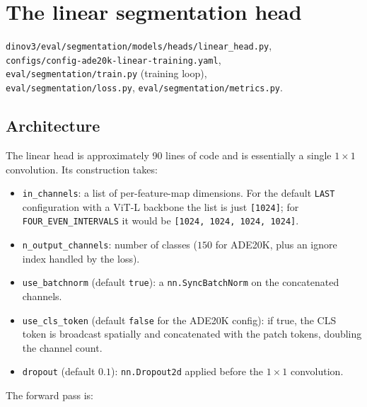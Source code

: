 \documentclass[11pt,a4paper]{article}
\begin{document}
\section{The linear segmentation head}
\label{sec:linear}

\begin{srcbox}
\texttt{dinov3/eval/segmentation/models/heads/linear\_head.py},\\
\texttt{configs/config-ade20k-linear-training.yaml},\\
\texttt{eval/segmentation/train.py} (training loop),\\
\texttt{eval/segmentation/loss.py}, \texttt{eval/segmentation/metrics.py}.
\end{srcbox}

\subsection{Architecture}

The linear head is approximately 90 lines of code and is essentially a
single $1{\times}1$ convolution. Its construction takes:
\begin{itemize}[leftmargin=1.6em,itemsep=0pt]
  \item \texttt{in\_channels}: a list of per-feature-map dimensions. For
        the default \texttt{LAST} configuration with a ViT-L backbone the
        list is just \texttt{[1024]}; for \texttt{FOUR\_EVEN\_INTERVALS}
        it would be \texttt{[1024, 1024, 1024, 1024]}.
  \item \texttt{n\_output\_channels}: number of classes
        ($150$ for ADE20K, plus an ignore index handled by the loss).
  \item \texttt{use\_batchnorm} (default \texttt{true}): a
        \texttt{nn.SyncBatchNorm} on the concatenated channels.
  \item \texttt{use\_cls\_token} (default \texttt{false} for the ADE20K
        config): if true, the CLS token is broadcast spatially and
        concatenated with the patch tokens, doubling the channel count.
  \item \texttt{dropout} (default $0.1$): \texttt{nn.Dropout2d} applied
        before the $1{\times}1$ convolution.
\end{itemize}

The forward pass is:
\end{document}

